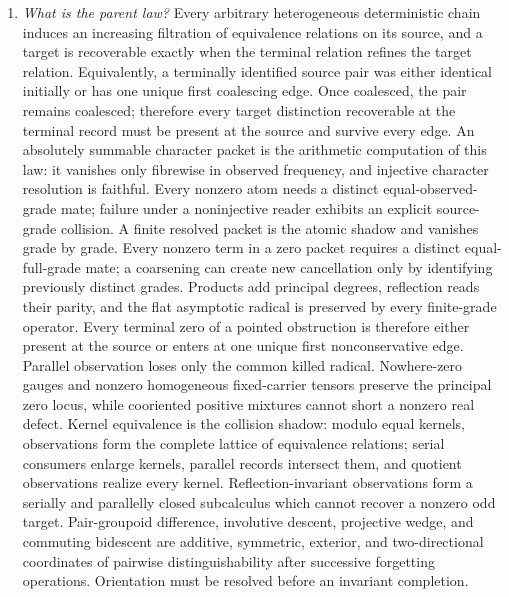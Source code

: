 \documentclass[11pt]{article}
\theoremstyle{definition}
\theoremstyle{remark}
\begin{document}
\begin{enumerate}[leftmargin=2.2em]
\item \emph{What is the parent law?}
      Every arbitrary heterogeneous deterministic chain induces an increasing
      filtration of equivalence relations on its source, and a target is
      recoverable exactly when the terminal relation refines the target
      relation.  Equivalently, a terminally
      identified source pair was either identical initially or has one unique
      first coalescing edge.  Once coalesced, the pair remains coalesced;
      therefore every target distinction recoverable at the terminal record
      must be present at the source and survive every edge.  An absolutely
      summable character packet is the arithmetic computation of this law:
      it vanishes only fibrewise in observed frequency, and injective
      character resolution is faithful.
      Every nonzero atom needs a distinct equal-observed-grade mate; failure
      under a noninjective reader exhibits an explicit source-grade
      collision.  A finite resolved packet is the atomic shadow and vanishes
      grade by grade.  Every nonzero term in a
      zero packet requires a distinct equal-full-grade mate; a coarsening can
      create new cancellation only by identifying previously distinct grades.
      Products add principal degrees, reflection reads their parity, and the
      flat asymptotic radical is preserved by every finite-grade operator.
      Every terminal zero of a pointed obstruction is therefore either present
      at the source or enters at one unique first nonconservative edge.
      Parallel observation loses only the common killed radical.  Nowhere-zero
      gauges and nonzero homogeneous fixed-carrier tensors preserve the
      principal zero locus, while cooriented positive mixtures cannot short a
      nonzero real defect.  Kernel equivalence is the collision shadow: modulo
      equal kernels, observations form the complete lattice of equivalence
      relations; serial consumers enlarge kernels, parallel records intersect
      them, and quotient observations realize every kernel.
      Reflection-invariant observations form a serially and parallelly closed
      subcalculus which cannot recover a nonzero odd target.  Pair-groupoid
      difference, involutive descent, projective wedge, and commuting
      bidescent are additive, symmetric, exterior, and two-directional
      coordinates of pairwise distinguishability after successive forgetting
      operations.  Orientation must be resolved before an invariant completion.

\end{enumerate}
\end{document}

